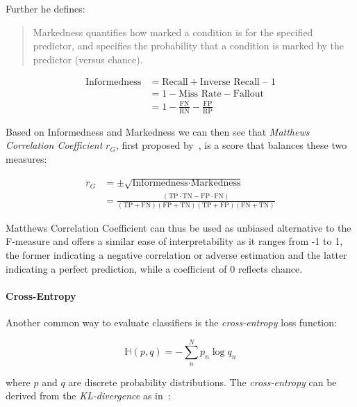 Further he defines:
\blockquote{Markedness quantifies how marked a condition is for the specified predictor, and specifies the probability that a condition is marked by the predictor (versus chance).}

\begin{equation}
  \begin{split}
  \text{Informedness} &= \text{Recall} + \text{Inverse Recall} \text{ – } 1 \\
  &= 1 - \text{Miss Rate} - \text{Fallout} \\
  &= 1 - \frac{\text{FN}}{ \text{RN}} - \frac{\text{FP}}{\text{RP}}
  \end{split}
\end{equation}

Based on Informedness and Markedness we can then see that \emph{Matthews Correlation Coefficient} $r_{G}$, first proposed by~\cite{Matthews:1975aa}, is a score that balances these two measures:

\begin{equation}
  \begin{split}
  r_{G} &= \pm \sqrt{\text{Informedness} \cdot \text{Markedness}} \\
  &= \frac{(\text{TP} \cdot \text{TN} - \text{FP} \cdot \text{FN})}{(\text{TP} + \text{FN})(\text{FP} + \text{TN})(\text{TP} + \text{FP})(\text{FN} + \text{TN})}
\end{split}
\end{equation}

Matthews Correlation Coefficient can thus be used as unbiased alternative to the F-measure and offers a similar ease of interpretability as it ranges from -1 to 1, the former indicating a negative correlation or adverse estimation and the latter  indicating a perfect prediction, while a coefficient of 0 reflects chance.

\paragraph{Cross-Entropy}
\label{par:Cross-Entropy}

Another common way to evaluate classifiers is the \emph{cross-entropy} loss function:

\begin{equation}
  \mathbb{H}(p,q) = - \sum_n^N p_n \log q_n
\end{equation}

where $p$ and $q$ are discrete probability distributions. The \emph{cross-entropy} can be derived from the \emph{KL-divergence} as in~\cite[Chapter 2.8.2, p.~57]{Murphy:2012aa}:

